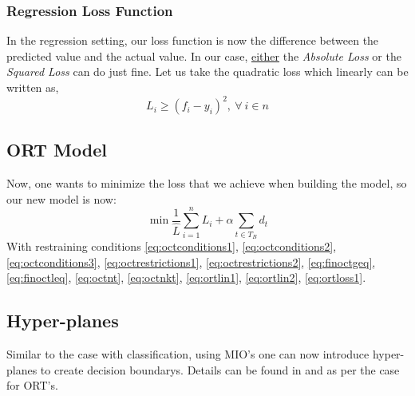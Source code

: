\documentclass[11pt,a4paper]{report}
\begin{document}
\subsubsection{Regression Loss Function}
In the regression setting, our loss function is now the difference between the predicted value and the actual value.
In our case, \underline{either} the \textit{Absolute Loss} or the \textit{Squared Loss} can do just fine. 
Let us take the quadratic loss which linearly can be written as,
\begin{equation}
    L_i \geq (f_i - y_i)^2, \ \forall \ i \in n \label{eq:ortloss1}
\end{equation}

\subsection{ORT Model}
Now, one wants to minimize the loss that we achieve when building the model, so our new model is now:
\begin{equation}
    \min \frac{1}{\hat{L}} \sum_{i=1}^{n} L_i + \alpha \sum_{t \in T_B} d_t
    \label{eq:ortmodel}
\end{equation}
With restraining conditions \ref{eq:octconditions1}, \ref{eq:octconditions2}, \ref{eq:octconditions3}, \ref{eq:octrestrictions1}, \ref{eq:octrestrictions2}, \ref{eq:finoctgeq}, \ref{eq:finoctleq}, \ref{eq:octnt}, \ref{eq:octnkt}, \ref{eq:ortlin1}, \ref{eq:ortlin2}, \ref{eq:ortloss1}.

\subsection{Hyper-planes}
Similar to the case with classification, using MIO's one can now introduce hyper-planes to create decision boundarys.
Details can be found in \cite{octbook} and \cite{jackdunn} as per the case for ORT's.
\end{document}
